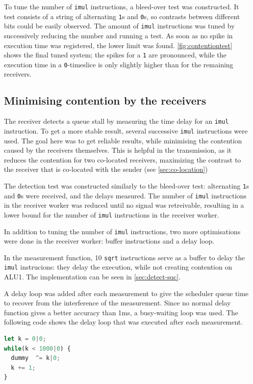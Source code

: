 \documentclass[11pt,
  titlepage=false,
]{scrreprt}
\begin{document}
To tune the number of \texttt{imul} instructions, a bleed-over test was constructed.
It test consists of a string of alternating \texttt{1}s and \texttt{0}s, so contrasts between different bits could be easily observed.
The amount of \texttt{imul} instructions was tuned by successively reducing the number and running a test.
As soon as no spike in execution time was registered, the lower limit was found.
\ref{fig:contentiontest} shows the final tuned system;
the spikes for a \texttt{1} are pronounced, while the execution time in a \texttt{0}-timeslice is only slightly higher than for the remaining receivers.

\subsection{Minimising contention by the receivers}
\label{sec:reducecontention}
The receiver detects a queue stall by measuring the time delay for an \texttt{imul} instruction.
To get a more stable result, several successive \texttt{imul} instructions were used.
The goal here was to get reliable results, while minimising the contention caused by the receivers themselves.
This is helpful in the transmission, as it reduces the contention for two co-located receivers,
maximizing the contrast to the receiver that is co-located with the sender (see \ref{sec:co-location})

The detection test was constructed similarly to the bleed-over test:
alternating \texttt{1}s and \texttt{0}s were received, and the delays measured.
The number of \texttt{imul} instructions in the receiver worker was reduced until no signal was retreivable,
resulting in a lower bound for the number of \texttt{imul} instructions in the receiver worker.

In addition to tuning the number of \texttt{imul} instructions, two more optimisations were done in the receiver worker:
buffer instructions and a delay loop.

In the measurement function, 10 \texttt{sqrt} instructions serve as a buffer to delay the \texttt{imul} instrucions:
they delay the execution, while not creating contention on ALU1.
The implementation can be seen in \ref{sec:detect-sqc}.

A delay loop was added after each measurement to give the scheduler queue time to recover from the interference of the measurement.
Since no normal delay function gives a better accuracy than 1ms, a busy-waiting loop was used.
The following code shows the delay loop that was executed after each measurement.
\begin{lstlisting}[language=JavaScript]
let k = 0|0;
while(k < 1000|0) {
  dummy  ^= k|0;
  k += 1;
}
\end{lstlisting}
\end{document}
